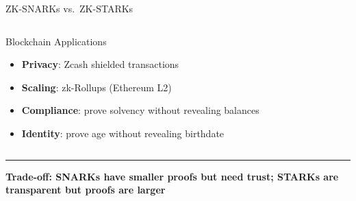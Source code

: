 \documentclass[8pt,aspectratio=169]{beamer}
\newcommand{\bottomnote}[1]{\vfill\vspace{-2mm}\textcolor{mllavender2}{\rule{\textwidth}{0.4pt}}\vspace{1mm}\footnotesize\textbf{#1}}
\begin{document}
\begin{frame}{ZK-SNARKs vs.\ ZK-STARKs}
\begin{columns}
\begin{block}{Blockchain Applications}
\begin{itemize}\small
  \item \textbf{Privacy}: Zcash shielded transactions
  \item \textbf{Scaling}: zk-Rollups (Ethereum L2)
  \item \textbf{Compliance}: prove solvency without revealing balances
  \item \textbf{Identity}: prove age without revealing birthdate
\end{itemize}
\end{block}
\end{columns}
\bottomnote{Trade-off: SNARKs have smaller proofs but need trust; STARKs are transparent but proofs are larger}
\end{frame}

\end{document}
